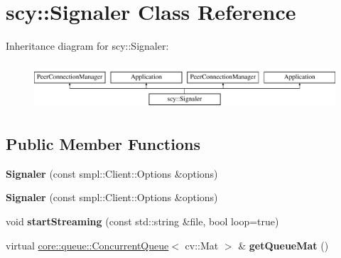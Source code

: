 \hypertarget{classscy_1_1_signaler}{}\section{scy\+:\+:Signaler Class Reference}
\label{classscy_1_1_signaler}
Inheritance diagram for scy\+:\+:Signaler\+:\begin{figure}[H]
\begin{center}
\leavevmode
\includegraphics[height=1.728395cm]{d1/dc1/classscy_1_1_signaler}
\end{center}
\end{figure}
\subsection*{Public Member Functions}
\begin{DoxyCompactItemize}
\item 
\mbox{\label{classscy_1_1_signaler_abe8212f1e65843055ebae1a12862f410}} 
{\bfseries Signaler} (const smpl\+::\+Client\+::\+Options \&options)
\item 
\mbox{\label{classscy_1_1_signaler_abe8212f1e65843055ebae1a12862f410}} 
{\bfseries Signaler} (const smpl\+::\+Client\+::\+Options \&options)
\item 
\mbox{\label{classscy_1_1_signaler_aed0cc05659bd2020b13a99d5541e97f7}} 
void {\bfseries start\+Streaming} (const std\+::string \&file, bool loop=true)
\item 
\mbox{\label{classscy_1_1_signaler_ac4c90e4b5f82bc0e072ee2439d16f6dc}} 
virtual \hyperlink{classcore_1_1queue_1_1_concurrent_queue}{core\+::queue\+::\+Concurrent\+Queue}$<$ cv\+::\+Mat $>$ \& {\bfseries get\+Queue\+Mat} ()
\end{DoxyCompactItemize}

